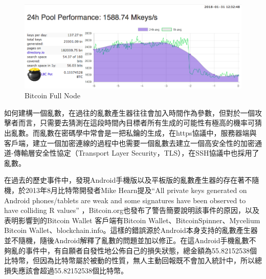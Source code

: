			\begin{figure}[h]
				\centering
				\includegraphics[width = .9\textwidth]{LBC.png}
				\caption{Bitcoin Full Node\supercite{TheLargeBitcoinCollider}}\label{LBC}
			\end{figure}

			如何建構一個亂數，在過往的亂數產生器往往會加入時間作為參數，但對於一個攻擊者而言，只需要去猜測在這段時間內目標者所有生成的可能性有極高的機率可猜出亂數。而亂數在密碼學中常會是一把私鑰的生成，在https協議中，服務器端與客戶端，建立一個加密連線的過程中也需要一個亂數去建立一個高安全性的加密通道-傳輸層安全性協定（Transport Layer Security，TLS）\supercite{dierks2008transport}，在SSH協議中也採用了亂數。
	
			在過去的歷史事件中，發現Android手機版以及平板版的亂數產生器的存在著不隨機，於2013年8月比特幣開發者Mike Hearn提及“All private keys generated on Android phones/tablets are weak and some signatures have been observed to have colliding R values” \supercite{SomeSecureRandomThoughts}，Bitcoin.org也發布了警告\supercite{AndroidSecurityVulnerability}簡要說明該事件的原因，以及表明影響到的Bitcoin Wallet 客戶端有Bitcoin Wallet、BitcoinSpinner、Mycelium Bitcoin Wallet、blockchain.info。這樣的錯誤源於Android本身支持的亂數產生器並不隨機，隨後Android解釋了亂數的問題並加以修正。在這Android手機亂數不夠亂的事件中，有自願者自發性地公佈自己的損失狀態，總金額為55.82152538個比特幣\supercite{Badsignaturesleading}，但因為比特幣屬於被動的性質，無人主動回報既不會加入統計中，所以總損失應該會超過55.82152538個比特幣。

